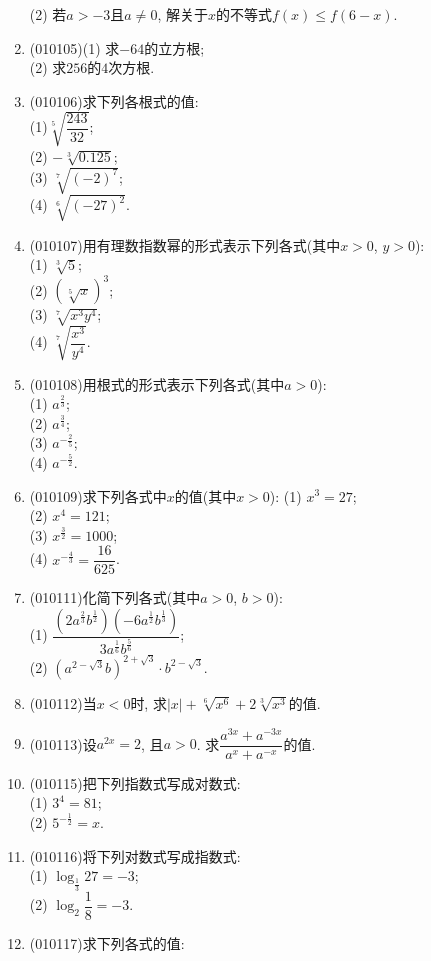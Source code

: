 \documentclass[10pt,a4paper]{article}
\begin{document}
\begin{enumerate}[1.]
(2) 若$a>-3$且$a\ne 0$, 解关于$x$的不等式$f(x)\le f(6-x)$.
\item {\tiny (010105)}(1) 求$-64$的立方根;\\
(2) 求$256$的$4$次方根.
\item {\tiny (010106)}求下列各根式的值:\\
(1)$\sqrt[5]{\dfrac{243}{32}}$;\\
(2) $-\sqrt[3]{0.125}$;\\
(3) $\sqrt[7]{(-2)^7}$;\\
(4) $\sqrt[6]{(-27)^2}$.
\item {\tiny (010107)}用有理数指数幂的形式表示下列各式(其中$x>0$, $y>0$):\\
(1) $\sqrt[3]{5}$;\\
(2) $(\sqrt[5]{x})^3$;\\
(3) $\sqrt[7]{x^3y^4}$;\\
(4) $\sqrt[7]{\dfrac{x^3}{y^4}}$.
\item {\tiny (010108)}用根式的形式表示下列各式(其中$a>0$):\\
(1) $a^\frac 23$;\\
(2) $a^\frac 34$;\\
(3) $a^{-\frac 25}$;\\
(4) $a^{-\frac 52}$.
\item {\tiny (010109)}求下列各式中$x$的值(其中$x>0$):
(1) $x^3=27$;\\
(2) $x^4=121$;\\
(3) $x^\frac 32=1000$;\\
(4) $x^{-\frac 43}=\dfrac{16}{625}$.
\item {\tiny (010111)}化简下列各式(其中$a>0$, $b>0$):\\
(1) $\dfrac{(2a^\frac 23b^\frac 12)(-6a^\frac 12b^\frac 13)}{3a^\frac 16b^\frac 56}$;\\
(2) $(a^{2-\sqrt 3}b)^{2+\sqrt 3}\cdot b^{2-\sqrt 3}$.
\item {\tiny (010112)}当$x<0$时, 求$|x|+\sqrt[6]{x^6}+2\sqrt[3]{x^3}$的值.
\item {\tiny (010113)}设$a^{2x}=2$, 且$a>0$. 求$\dfrac{a^{3x}+a^{-3x}}{a^x+a^{-x}}$的值.
\item {\tiny (010115)}把下列指数式写成对数式:\\
(1) $3^4=81$;\\
(2) $5^{-\frac1 2}=x$.
\item {\tiny (010116)}将下列对数式写成指数式:\\
(1) $\log_{\frac 13}27=-3$;\\
(2) $\log_2\dfrac 18=-3$.
\item {\tiny (010117)}求下列各式的值:\\

\end{enumerate}
\end{document}
